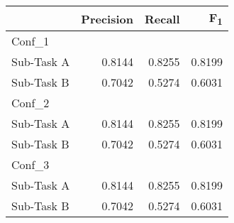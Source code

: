 \documentclass[11pt,a4paper]{article}
\begin{document}
\begin{table}[!h]
\begin{center}
\begin{tabular}{|l|r|r|r|}
\hline\centering\textbf{}  & \textbf{Precision} &  \textbf{Recall} &  \textbf{F\textsubscript{1}}\\
\hline
Conf\_1 & & & \\
\hline
 Sub-Task A   &  0.8144 & 0.8255 & 0.8199 \\
 Sub-Task B   &  0.7042 & 0.5274 & 0.6031 \\
\hline
\hline
Conf\_2 & & & \\
\hline
 Sub-Task A   &  0.8144 & 0.8255 & 0.8199 \\
 Sub-Task B   &  0.7042 & 0.5274 & 0.6031 \\
\hline
\hline
Conf\_3 & & & \\
\hline
 Sub-Task A   &  0.8144 & 0.8255 & 0.8199 \\
 Sub-Task B   &  0.7042 & 0.5274 & 0.6031 \\
\hline
\hline
\end{tabular}
\end{center}
\caption{\label{}}
\end{table}



\begin{comment}
low	TRUE
simple	TRUE
stopwords	TRUE

[[256, 10], [256, 7], [256, 5], [256, 3], [256, 2], [256, 1]]
kernel_initializer=random_uniform
de-wiki-fasttext-300d-1M
dropout_p = 0.5
fully_connected_layers=2
adam
batch_size=128,
shuffle=True,
validation_split=0.4,
verbose=1,
epochs=250
filtered = np.array(len(labels2idx) * [0.4])


subtask_a			subtask_b
Precision	0.8389		Precision	0.6733
Recall	0.7659		Recall	0.5032
F1	0.8008		F1	0.576
\end{comment}



\begin{comment}

classifier			tokenisation schema
[[256, 10], [256, 7], [256, 5], [256, 3], [256, 2], [256, 1]]			low	TRUE
kernel_initializer=random_uniform			simple	TRUE
de-wiki-fasttext-300d-1M			stopwords	TRUE
dropout_p = 0.5
fully_connected_layers=2
adam
batch_size=128,
shuffle=True,
validation_split=0.4,
verbose=1,
epochs=500
filtered = np.array(len(labels2idx) * [0.4])

subtask_a			subtask_b
Precision	0.7875		Precision	0.6235
Recall	0.7942		Recall	0.5066
F1	0.7908		F1	0.559
\begin{comment}


\begin{comment}
[[256, 10], [256, 7], [256, 5], [256, 3], [256, 2], [256, 1]]
dropout_p = 0.5
fully_connected_layers=2
adam
batch_size=128,
shuffle=True,
epochs=250

subtask_a			subtask_b
Precision	0.3355		Precision	0.2381
Recall	0.6256		Recall	0.3057
F1	0.4368		F1	0.2677
\end{comment}
\end{document}
